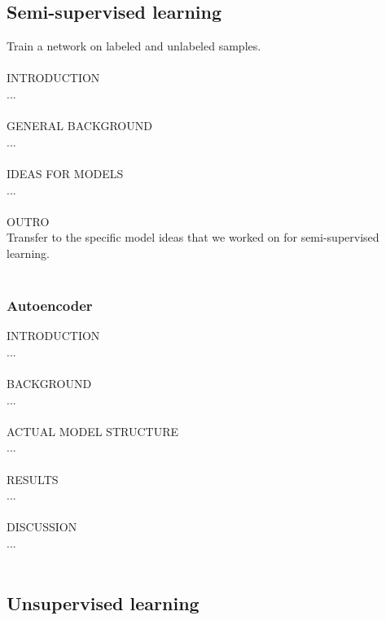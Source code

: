 \subsection{Semi-supervised learning}

Train a network on labeled and unlabeled samples. \\
\\
INTRODUCTION \\
... \\
\\
GENERAL BACKGROUND \\
... \\
\\
IDEAS FOR MODELS \\
... \\
\\
OUTRO \\
Transfer to the specific model ideas that we worked on for semi-supervised learning. \\
\\

\subsubsection{Autoencoder}

INTRODUCTION \\
... \\
\\
BACKGROUND \\
... \\
\\
ACTUAL MODEL STRUCTURE \\
... \\
\\
RESULTS \\
... \\
\\
DISCUSSION \\
... \\
\\

\subsection{Unsupervised learning}

